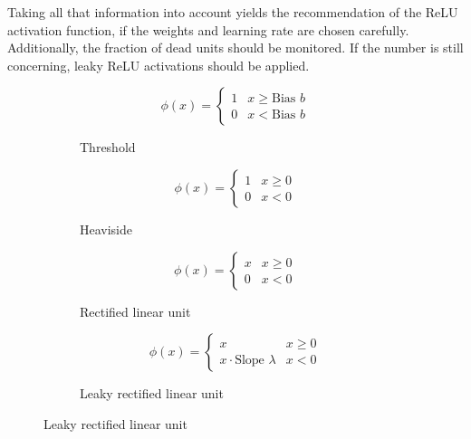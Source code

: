 Taking all that information into account yields the recommendation of the ReLU activation function, if the weights and learning rate are chosen carefully.
Additionally, the fraction of dead units should be monitored.
If the number is still concerning, leaky ReLU activations should be applied.
\begin{figure}
	\setlength{}
	\setlength{}
	\centering
	\begin{subfigure}{.5\textwidth}
		\centering
		
		\begin{equation*}
		\phi(x) =
		\begin{cases}
		1 & x \geq \text{Bias $b$} \\
		0 & x < \text{Bias $b$}
		\end{cases}
		\end{equation*}
		\caption{Threshold}
		\label{fig:threshold-activation}
	\end{subfigure}%
	\begin{subfigure}{.5\textwidth}
		\centering
		
		\begin{equation*}
		\phi(x) =
		\begin{cases}
		1 & x \geq 0 \\
		0 & x < 0
		\end{cases}
		\end{equation*}
		\caption{Heaviside}
		\label{fig:heaviside-activation}
	\end{subfigure}
	
	\begin{subfigure}{.5\textwidth}
		\centering
		
		\begin{equation*}
		\phi(x) =
		\begin{cases}
		x & x \geq 0 \\
		0 & x < 0
		\end{cases}
		\end{equation*}
		\caption{Rectified linear unit}
		\label{fig:relu-activation}
	\end{subfigure}%
	\begin{subfigure}{.5\textwidth}
		\centering
		
		\begin{equation*}
		\phi(x) =
		\begin{cases}
		x & x \geq 0 \\
		x\cdot \text{Slope $\lambda$} & x < 0
		\end{cases}
		\end{equation*}
		\caption{Leaky rectified linear unit}
		\label{fig:leakyrelu-activation}
	\end{subfigure}
	

\end{figure}
